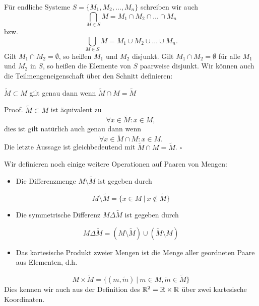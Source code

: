 Für endliche Systeme \(S=\{M_1,M_2,\ldots,M_n\}\) schreiben wir auch
\begin{equation*}
 \bigcap_{M \in S} M  = M_1 \cap M_2 \cap \ldots \cap M_n
\end{equation*}
bzw.
\begin{equation*}
 \bigcup_{M \in S} M  = M_1 \cup M_2 \cup \ldots \cup M_n.
\end{equation*}
Gilt \(M_1 \cap M_2 = \emptyset\), so heißen \(M_1\) und \(M_2\) disjunkt. Gilt \(M_1 \cap M_2 = \emptyset\) für alle \(M_1\) und \(M_2\) in \(S\), so heißen die Elemente von \(S\) paarweise disjunkt.
Wir können auch die Teilmengeneigenschaft über den Schnitt definieren:
\label{grundlagen/mengenlogik:lemma-2}
\begin{lemma}{}{}



\(\tilde M \subset M\) gilt genau dann wenn \(\tilde M \cap M = \tilde M\)
\end{lemma}

\begin{emphBox}{}{}
Proof. \(\tilde M  \subset M\) ist äquivalent zu
\begin{equation*}
 \forall x \in \tilde M: x \in M,
\end{equation*}
dies ist gilt natürlich auch genau dann wenn
\begin{equation*}
 \forall x \in \tilde M \cap M: x \in M.
\end{equation*}
Die letzte Aussage ist gleichbedeutend mit \(\tilde M \cap M = \tilde M\).
\(\square\)
\end{emphBox}

Wir definieren noch einige weitere Operationen auf Paaren von Mengen:
\begin{itemize}
\item {} 
Die Differenzmenge \(M \setminus \tilde M\) ist gegeben durch

\end{itemize}
\begin{equation*}
 M \setminus \tilde M = \{ x \in M ~|~ x \notin \tilde M\}
\end{equation*}\begin{itemize}
\item {} 
Die symmetrische Differenz \(M \Delta \tilde M\) ist gegeben durch

\end{itemize}
\begin{equation*}
 M \Delta \tilde M = (M \setminus \tilde M ) \cup (\tilde M \setminus M)
\end{equation*}\begin{itemize}
\item {} 
Das kartesische Produkt zweier Mengen ist die Menge aller geordneten Paare aus Elementen, d.h.

\end{itemize}
\begin{equation*}
 M \times \tilde M = \{ (m,\tilde m) ~|~ m \in M, \tilde m \in \tilde M\}
\end{equation*}
Dies kennen wir auch aus der Definition des \(\mathbb{R}^2 = \mathbb{R} \times \mathbb{R}\) über zwei kartesische Koordinaten.

